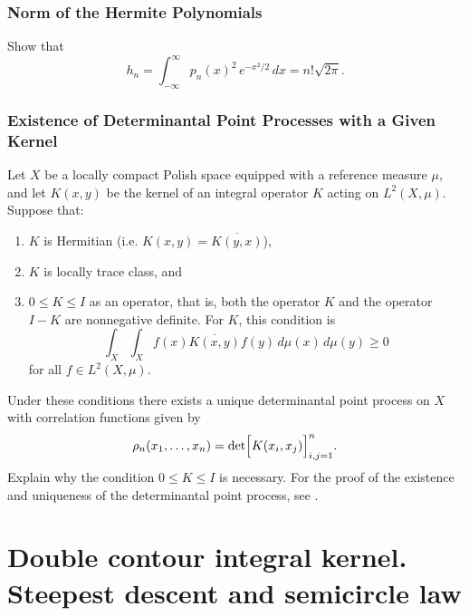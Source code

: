 \documentclass[letterpaper,11pt,oneside,reqno]{book}
\numberwithin{equation}{chapter}  %
\theoremstyle{definition}
\begin{document}
\subsection{Norm of the Hermite Polynomials}
\label{lecture5:prob:norm}

Show that
\begin{equation*}
	h_n=\int_{-\infty}^{\infty} p_n(x)^2\,e^{-x^2/2}\,dx=n!\sqrt{2\pi}.
\end{equation*}




\subsection{Existence of Determinantal Point Processes with a Given Kernel}
Let \(X\) be a locally compact Polish space equipped with a reference measure \(\mu\), and let \(K(x,y)\) be the kernel of an integral operator \(K\) acting on \(L^2(X,\mu)\). Suppose that:
\begin{enumerate}
	\item \(K\) is Hermitian (i.e. \(K(x,y)=\overline{K(y,x)}\)),
	\item \(K\) is locally trace class, and
	\item \(0\le K\le I\) as an operator, that is, both the operator \(K\) and the operator \(I-K\) are nonnegative definite. For $K$, this condition is
	\[
	\int_X\int_X f(x)\overline{K(x,y)}f(y)\,d\mu(x)\,d\mu(y)\ge0
	\]
	for all \(f\in L^2(X,\mu)\).
\end{enumerate}
Under these conditions there exists a unique determinantal point process on \(X\) with correlation functions given by
\[
\rho_n(x_1,\dots,x_n)=\det\Bigl[K(x_i,x_j)\Bigr]_{i,j=1}^n.
\]
Explain why the condition \(0\le K\le I\) is necessary.
For the proof of the existence and uniqueness of the determinantal point process, see \cite{Soshnikov2000}.













\chapter{Double contour integral kernel. Steepest descent and semicircle law}
\label{chap:lecture6}
\end{document}
